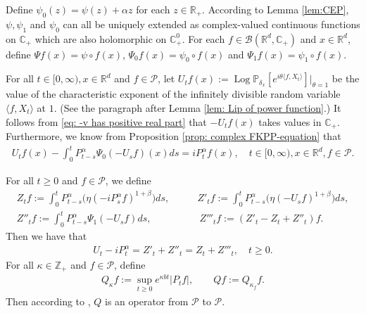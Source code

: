\documentclass[12pt,a4paper]{amsart}
\theoremstyle{plain}
\theoremstyle{definition}
\numberwithin{equation}{section}
\begin{document}
Define $\psi_0(z) = \psi(z) + \alpha z$ for each $z\in \mathbb{R}_+$.
According to Lemma \ref{lem:CEP}, $\psi, \psi_1$ and $\psi_0$ can all be uniquely extended as complex-valued continuous functions on $\mathbb C_+$ which are also holomorphic on $\mathbb C^0_+$.
For each $f\in \mathcal B(\mathbb R^d, \mathbb C_+)$ and $x\in \mathbb R^d$, define $\Psi f (x) = \psi\circ f(x)$, $\Psi_0 f(x)= \psi_0 \circ f(x)$ and $\Psi_1 f(x)= \psi_1 \circ f(x)$.

For all $t\in [0,\infty), x\in \mathbb R^d $ and $f \in \mathcal{P}$, let $ U_tf(x) := \operatorname{Log} \mathbb P_{\delta_x}[e^{i\theta \langle f, X_t\rangle}]|_{\theta = 1} $ be the value of the characteristic exponent of the infinitely divisible random variable $\langle f, X_t\rangle$ at $1$.
(See the paragraph after Lemma \ref{lem: Lip of power function}.)
It follows from \eqref{eq: -v has positive real part} that $-U_tf(x)$ takes values in $\mathbb C_+$. Furthermore, we know from Proposition \ref{prop: complex FKPP-equation} that
\begin{align}
  \label{eq:chareq2}
  U_tf(x) - \int_0^t P^\alpha_{t-s} \Psi_0(-U_sf)(x)ds
  = i P^{\alpha}_t f(x)
  , \quad t\in [0,\infty), x\in \mathbb{R}^d, f\in \mathcal P.
\end{align}

For all $t\geq 0$ and $f\in \mathcal P$, we define
\begin{align}
  \label{eq: def of Zf}
  Z_t f
  := \int_0^t P^\alpha_{t-s}\big( \eta (-i P^\alpha_sf)^{1+\beta}\big)ds,
  & \qquad Z'_t f
    := \int_0^t P^\alpha_{t-s}\big( \eta (-U_s f)^{1+\beta}\big)ds,
  \\ Z''_t f
  := \int_0^t P^\alpha_{t-s}\Psi_1(-U_s f)ds,
  & \qquad\  Z'''_t f
    := (Z'_t - Z_t+ Z''_t)f.
\end{align}
Then we have that
\begin{align}
  \label{eq: key equality}
  U_t - i P^\alpha_t
  = Z'_t + Z''_t
  = Z_t + Z'''_t
  , \quad t\geq 0.
\end{align}
For all $\kappa \in \mathbb Z_+$ and $f\in \mathcal P$, define
\begin{align}
  \label{eq:Q}
  Q_\kappa f
  := \sup_{t\geq 0} e^{\kappa b t}|P_t f|,
  \qquad  Q f
  := Q_{\kappa_f}f.
\end{align}
Then according to \cite[Fact 1.2]{MarksMilos2018CLT}, $Q$ is an operator from $\mathcal P$ to $\mathcal P$.
\end{document}
